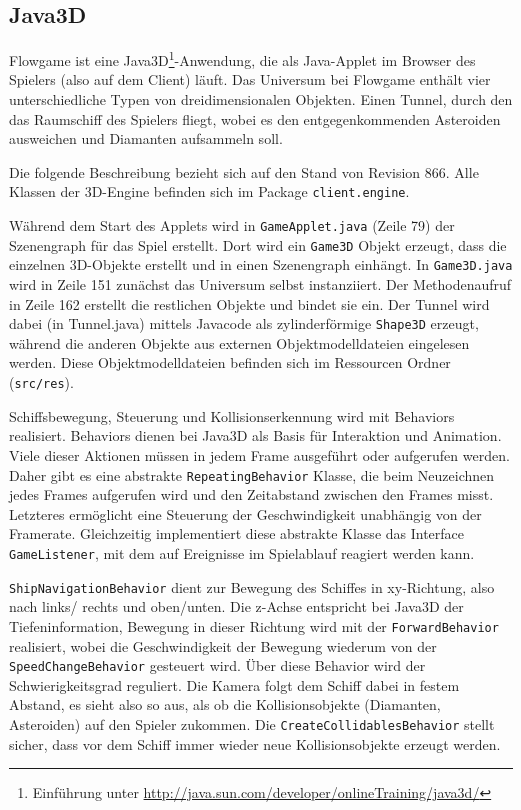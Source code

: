 \documentclass[a4paper,12pt]{scrartcl}
\begin{document}
\subsection{Java3D}
Flowgame ist eine Java3D\footnote{Einführung unter
\url{http://java.sun.com/developer/onlineTraining/java3d/}}-Anwendung, die als
Java-Applet im Browser des Spielers (also auf dem Client) läuft. Das Universum bei Flowgame enthält vier unterschiedliche Typen von dreidimensionalen Objekten. Einen Tunnel, durch den das Raumschiff des Spielers fliegt,
wobei es den entgegenkommenden Asteroiden ausweichen und Diamanten aufsammeln
soll.

Die folgende Beschreibung bezieht sich auf den Stand von Revision 866.
Alle Klassen der 3D-Engine befinden sich im Package \texttt{client.engine}.

Während dem Start des Applets wird in \texttt{GameApplet.java} (Zeile 79) der
Szenengraph für das Spiel erstellt. Dort wird ein \texttt{Game3D} Objekt
erzeugt, dass die einzelnen 3D-Objekte erstellt und in einen Szenengraph
einhängt. In \texttt{Game3D.java} wird in Zeile 151 zunächst das Universum
selbst instanziiert. Der Methodenaufruf in Zeile 162 erstellt die restlichen Objekte und bindet sie ein. Der Tunnel wird dabei (in Tunnel.java) mittels
Javacode als zylinderförmige \texttt{Shape3D} erzeugt, während die anderen
Objekte aus externen Objektmodelldateien eingelesen werden. Diese Objektmodelldateien befinden sich im
Ressourcen Ordner (\texttt{src/res}).

Schiffsbewegung, Steuerung und Kollisionserkennung wird mit Behaviors realisiert.
Behaviors dienen bei Java3D als Basis für Interaktion und Animation. Viele dieser Aktionen
müssen in jedem Frame ausgeführt oder aufgerufen werden. Daher gibt es eine abstrakte
\texttt{RepeatingBehavior} Klasse, die beim Neuzeichnen jedes Frames aufgerufen
wird und den Zeitabstand zwischen den Frames misst. Letzteres ermöglicht eine Steuerung der
Geschwindigkeit unabhängig von der Framerate. Gleichzeitig implementiert diese abstrakte
Klasse das Interface \texttt{GameListener}, mit dem auf Ereignisse im
Spielablauf reagiert werden kann.

\texttt{ShipNavigationBehavior} dient zur Bewegung des Schiffes in xy-Richtung,
also nach links/ rechts und oben/unten. Die z-Achse entspricht bei Java3D der Tiefeninformation, Bewegung
in dieser Richtung wird mit der \texttt{ForwardBehavior} realisiert, wobei die
Geschwindigkeit der Bewegung wiederum von der \texttt{SpeedChangeBehavior}
gesteuert wird. Über diese Behavior wird der Schwierigkeitsgrad reguliert. Die
Kamera folgt dem Schiff dabei in festem Abstand, es sieht also so aus, als ob die Kollisionsobjekte (Diamanten, Asteroiden) auf den Spieler zukommen. Die
\texttt{CreateCollidablesBehavior} stellt sicher, dass vor dem Schiff immer wieder neue Kollisionsobjekte erzeugt werden.
\end{document}
